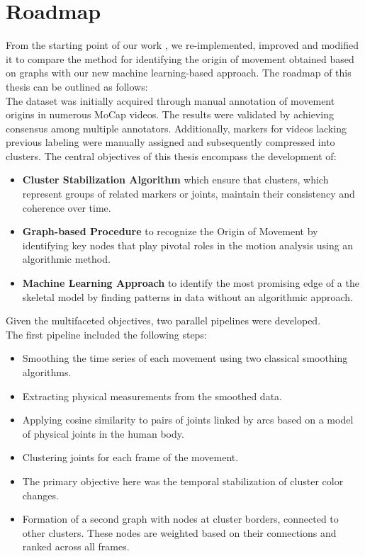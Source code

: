 \section{Roadmap}
From the starting point of our work \cite{kolykhalova:2020}, we re-implemented, improved and modified it to compare the method for identifying the origin of movement obtained based on graphs with our new machine learning-based approach.
The roadmap of this thesis can be outlined as follows: \\
The dataset was initially acquired through manual annotation of movement origins in numerous MoCap videos. 
The results were validated by achieving consensus among multiple annotators. 
Additionally, markers for videos lacking previous labeling were manually assigned and subsequently compressed into clusters.
The central objectives of this thesis encompass the development of:
\begin{itemize}
    \item \textbf{Cluster Stabilization Algorithm} which ensure that clusters, which represent groups of related markers or joints, maintain their consistency and coherence over time. 
    \item \textbf{Graph-based Procedure} to recognize the Origin of Movement by identifying key nodes that play pivotal roles in the motion analysis using an algorithmic method.
    \item \textbf{Machine Learning Approach} to identify the most promising edge of a the skeletal model by finding patterns in data without an algorithmic approach.
\end{itemize}
Given the multifaceted objectives, two parallel pipelines were developed.\\
The first pipeline included the following steps:
\begin{itemize}
    \item Smoothing the time series of each movement using two classical smoothing algorithms.
    \item Extracting physical measurements from the smoothed data.
    \item Applying cosine similarity to pairs of joints linked by arcs based on a model of physical joints in the human body.
    \item Clustering joints for each frame of the movement.
    \item The primary objective here was the temporal stabilization of cluster color changes.
    \item Formation of a second graph with nodes at cluster borders, connected to other clusters. These nodes are weighted based on their connections and ranked across all frames.
\end{itemize}
